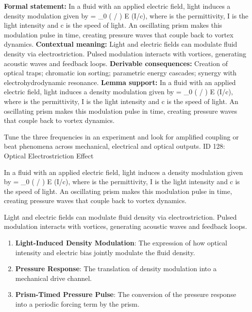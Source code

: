 \begingroup\footnotesize\setlength{\emergencystretch}{3em}\sloppy
\textbf{Formal statement:} In a fluid with an applied electric field, light induces a density modulation given by    =  \_0 (  /  ) E  (I/c), where   is the permittivity, I is the light intensity and c is the speed of light. An oscillating prism makes this modulation pulse in time, creating pressure waves that couple back to vortex dynamics.
\textbf{Contextual meaning:} Light and electric fields can modulate fluid density via electrostriction. Pulsed modulation interacts with vortices, generating acoustic waves and feedback loops.
\textbf{Derivable consequences:} Creation of optical traps; chromatic ion sorting; parametric energy cascades; synergy with electrohydrodynamic resonance.
\textbf{Lemma support:} In a fluid with an applied electric field, light induces a density modulation given by    =  \_0 (  /  ) E  (I/c), where   is the permittivity, I is the light intensity and c is the speed of light. An oscillating prism makes this modulation pulse in time, creating pressure waves that couple back to vortex dynamics.\par
\endgroup

Tune the three frequencies in an experiment and look for amplified coupling or beat phenomena across mechanical, electrical and optical outputs. ID 128: Optical Electrostriction Effect

In a fluid with an applied electric field, light induces a density modulation given by    =  \_0 (  /  ) E  (I/c), where   is the permittivity, I is the light intensity and c is the speed of light. An oscillating prism makes this modulation pulse in time, creating pressure waves that couple back to vortex dynamics.

Light and electric fields can modulate fluid density via electrostriction. Pulsed modulation interacts with vortices, generating acoustic waves and feedback loops.
\endgroup

\begin{enumerate}[leftmargin=1.6em,itemsep=6pt,topsep=4pt]
\item \textbf{Light-Induced Density Modulation}: The expression of how optical intensity and electric bias jointly modulate the fluid density.
\item \textbf{Pressure Response}: The translation of density modulation into a mechanical drive channel.
\item \textbf{Prism-Timed Pressure Pulse}: The conversion of the pressure response into a periodic forcing term by the prism.
\end{enumerate}

